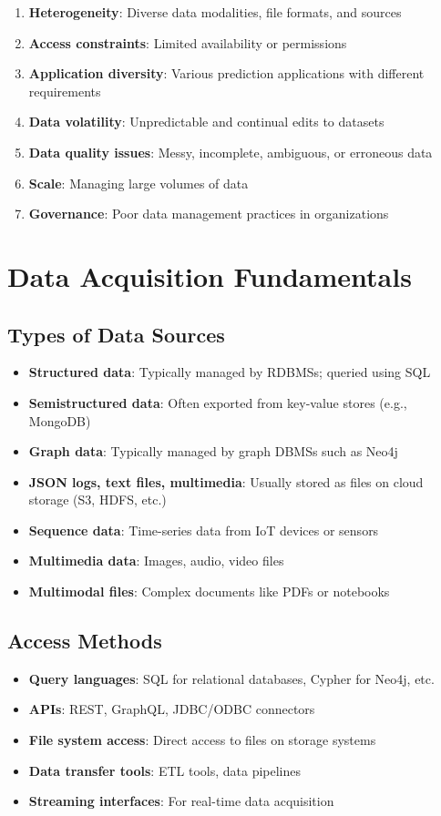 \documentclass[12pt]{article}
\begin{document}
\begin{enumerate}
    \item \textbf{Heterogeneity}: Diverse data modalities, file formats, and sources
    \item \textbf{Access constraints}: Limited availability or permissions
    \item \textbf{Application diversity}: Various prediction applications with different requirements
    \item \textbf{Data volatility}: Unpredictable and continual edits to datasets
    \item \textbf{Data quality issues}: Messy, incomplete, ambiguous, or erroneous data
    \item \textbf{Scale}: Managing large volumes of data
    \item \textbf{Governance}: Poor data management practices in organizations
\end{enumerate}

\section{Data Acquisition Fundamentals}

\subsection{Types of Data Sources}
\begin{itemize}
    \item \textbf{Structured data}: Typically managed by RDBMSs; queried using SQL
    \item \textbf{Semistructured data}: Often exported from key-value stores (e.g., MongoDB)
    \item \textbf{Graph data}: Typically managed by graph DBMSs such as Neo4j
    \item \textbf{JSON logs, text files, multimedia}: Usually stored as files on cloud storage (S3, HDFS, etc.)
    \item \textbf{Sequence data}: Time-series data from IoT devices or sensors
    \item \textbf{Multimedia data}: Images, audio, video files
    \item \textbf{Multimodal files}: Complex documents like PDFs or notebooks
\end{itemize}

\subsection{Access Methods}
\begin{itemize}
    \item \textbf{Query languages}: SQL for relational databases, Cypher for Neo4j, etc.
    \item \textbf{APIs}: REST, GraphQL, JDBC/ODBC connectors
    \item \textbf{File system access}: Direct access to files on storage systems
    \item \textbf{Data transfer tools}: ETL tools, data pipelines
    \item \textbf{Streaming interfaces}: For real-time data acquisition
\end{itemize}
\end{document}
